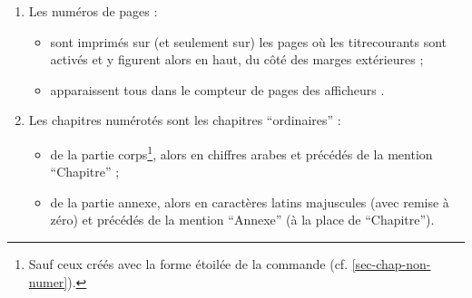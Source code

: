 \begin{enumerate}
  \begin{itemize}
  \item romains minuscules du début du mémoire jusqu'à la fin des
    \glspl{liminaire} ;
  \item arabes, avec remise à zéro, du début du corps jusqu'à la fin du
    mémoire.
  \end{itemize}
\item Les numéros de pages :
  \begin{itemize}
  \item sont imprimés sur (et seulement sur) les pages où les
    \glspl{titrecourant} sont activés et y figurent alors en haut, du côté des
    marges extérieures ;
  \item apparaissent tous dans le compteur de pages des afficheurs
    \pdf{}.
  \end{itemize}
\item Les chapitres numérotés sont les chapitres \enquote{ordinaires} :
  \begin{itemize}
  \item de la partie corps\footnote{Sauf ceux créés avec la forme étoilée de la
      commande  (cf. \vref{sec-chap-non-numer}).}, alors
    en chiffres arabes et précédés de la mention \enquote{Chapitre} ;
  \item de la partie annexe, alors en caractères latins majuscules (avec remise
    à zéro) et précédés de la mention \enquote{Annexe} (à la place de \enquote{Chapitre}).
  \end{itemize}
\end{enumerate}


